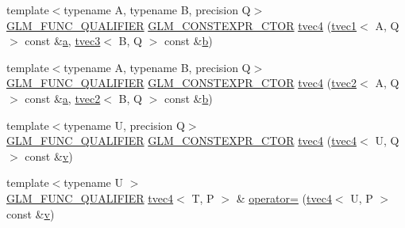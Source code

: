 \begin{DoxyCompactItemize}
\item 
{\footnotesize template$<$typename A, typename B, precision Q$>$ }\\\mbox{\hyperlink{setup_8hpp_a33fdea6f91c5f834105f7415e2a64407}{G\+L\+M\+\_\+\+F\+U\+N\+C\+\_\+\+Q\+U\+A\+L\+I\+F\+I\+ER}} \mbox{\hyperlink{setup_8hpp_ad34178a09666081abdb573c14d1f4a5a}{G\+L\+M\+\_\+\+C\+O\+N\+S\+T\+E\+X\+P\+R\+\_\+\+C\+T\+OR}} \mbox{\hyperlink{structglm_1_1tvec4_aebea9cbe53b55ac6ed167355f13c22ad}{tvec4}} (\mbox{\hyperlink{structglm_1_1tvec1}{tvec1}}$<$ A, Q $>$ const \&\mbox{\hyperlink{glad_8h_ac8729153468b5dcf13f971b21d84d4e5}{a}}, \mbox{\hyperlink{structglm_1_1tvec3}{tvec3}}$<$ B, Q $>$ const \&\mbox{\hyperlink{glad_8h_a6eba317e3cf44d6d26c04a5a8f197dcb}{b}})
\item 
{\footnotesize template$<$typename A, typename B, precision Q$>$ }\\\mbox{\hyperlink{setup_8hpp_a33fdea6f91c5f834105f7415e2a64407}{G\+L\+M\+\_\+\+F\+U\+N\+C\+\_\+\+Q\+U\+A\+L\+I\+F\+I\+ER}} \mbox{\hyperlink{setup_8hpp_ad34178a09666081abdb573c14d1f4a5a}{G\+L\+M\+\_\+\+C\+O\+N\+S\+T\+E\+X\+P\+R\+\_\+\+C\+T\+OR}} \mbox{\hyperlink{structglm_1_1tvec4_acbcc1f7e126da183f0d84b52f36416b5}{tvec4}} (\mbox{\hyperlink{structglm_1_1tvec2}{tvec2}}$<$ A, Q $>$ const \&\mbox{\hyperlink{glad_8h_ac8729153468b5dcf13f971b21d84d4e5}{a}}, \mbox{\hyperlink{structglm_1_1tvec2}{tvec2}}$<$ B, Q $>$ const \&\mbox{\hyperlink{glad_8h_a6eba317e3cf44d6d26c04a5a8f197dcb}{b}})
\item 
{\footnotesize template$<$typename U, precision Q$>$ }\\\mbox{\hyperlink{setup_8hpp_a33fdea6f91c5f834105f7415e2a64407}{G\+L\+M\+\_\+\+F\+U\+N\+C\+\_\+\+Q\+U\+A\+L\+I\+F\+I\+ER}} \mbox{\hyperlink{setup_8hpp_ad34178a09666081abdb573c14d1f4a5a}{G\+L\+M\+\_\+\+C\+O\+N\+S\+T\+E\+X\+P\+R\+\_\+\+C\+T\+OR}} \mbox{\hyperlink{structglm_1_1tvec4_a5fe1b0462052b13c3f0311c273d656e5}{tvec4}} (\mbox{\hyperlink{structglm_1_1tvec4}{tvec4}}$<$ U, Q $>$ const \&\mbox{\hyperlink{glad_8h_a14cfbe2fc2234f5504618905b69d1e06}{v}})
\item 
{\footnotesize template$<$typename U $>$ }\\\mbox{\hyperlink{setup_8hpp_a33fdea6f91c5f834105f7415e2a64407}{G\+L\+M\+\_\+\+F\+U\+N\+C\+\_\+\+Q\+U\+A\+L\+I\+F\+I\+ER}} \mbox{\hyperlink{structglm_1_1tvec4}{tvec4}}$<$ T, P $>$ \& \mbox{\hyperlink{structglm_1_1tvec4_a15eaeb5a1792f67622780d7c011b3dc4}{operator=}} (\mbox{\hyperlink{structglm_1_1tvec4}{tvec4}}$<$ U, P $>$ const \&\mbox{\hyperlink{glad_8h_a14cfbe2fc2234f5504618905b69d1e06}{v}})

\end{DoxyCompactItemize}
